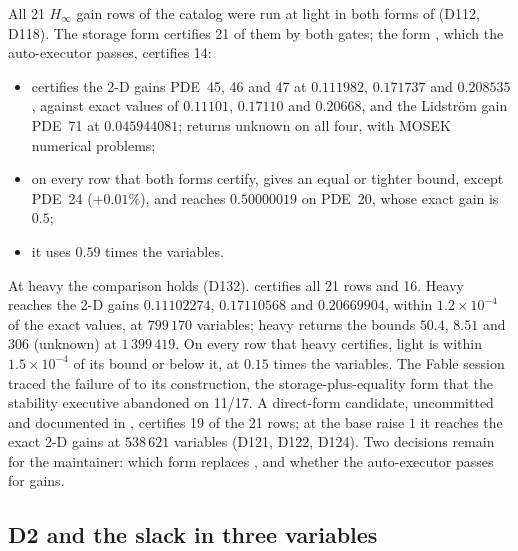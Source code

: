 All 21 $H_\infty$ gain rows of the catalog were run at light in both forms of  (D112, D118). The storage form  certifies 21 of them by both gates; the form , which the auto-executor passes, certifies 14:
\begin{itemize}\setlength\itemsep{0pt}
\item {} certifies the 2-D gains PDE~45, 46 and 47 at $0.111982$, $0.171737$ and $0.208535$, against exact values of $0.11101$, $0.17110$ and $0.20668$, and the Lidstr\"om gain PDE~71 at $0.045944081$;  returns unknown on all four, with MOSEK numerical problems;
\item on every row that both forms certify,  gives an equal or tighter bound, except PDE~24 ($+0.01\%$), and reaches $0.50000019$ on PDE~20, whose exact gain is $0.5$;
\item it uses $0.59$ times the variables.
\end{itemize}
At heavy the comparison holds (D132).  certifies all 21 rows and  16. Heavy  reaches the 2-D gains $0.11102274$, $0.17110568$ and $0.20669904$, within $1.2\times10^{-4}$ of the exact values, at $799\,170$ variables; heavy  returns the bounds $50.4$, $8.51$ and $306$ (unknown) at $1\,399\,419$. On every row that heavy  certifies, light  is within $1.5\times10^{-4}$ of its bound or below it, at $0.15$ times the variables.
The Fable session traced the failure of  to its construction, the storage-plus-equality form that the stability executive abandoned on 11/17. A direct-form candidate, uncommitted and documented in , certifies 19 of the 21 rows; at the base raise $1$ it reaches the exact 2-D gains at $538\,621$ variables (D121, D122, D124). Two decisions remain for the maintainer: which form replaces , and whether the auto-executor passes  for gains.

\subsection{D2 and the slack in three variables}\label{sec:st-d2}


